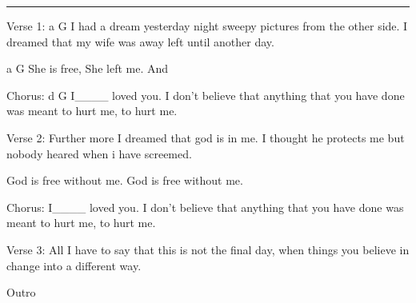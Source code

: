 \noindent\rule{\columnwidth}{1pt}

\begin{lstsong}
Verse 1:
a             G
I had a dream yesterday night
sweepy pictures from the other side.
I dreamed that my wife was away
left until another day.

a      G
She is free,
She left me. And

Chorus:
d     G
I____ loved you.
I don't believe that anything
that you have done was
meant to hurt me, to hurt me.

Verse 2:
Further more I dreamed
that god is in me.
I thought he protects me
but nobody heared when i have screemed.

God is free without me.
God is free without me.

Chorus:
I____ loved you.
I don't believe that anything
that you have done was
meant to hurt me, to hurt me.

Verse 3:
All I have to say
that this is not the final day,
when things you believe in
change into a different way.

Outro
\end{lstsong}
\newpage
